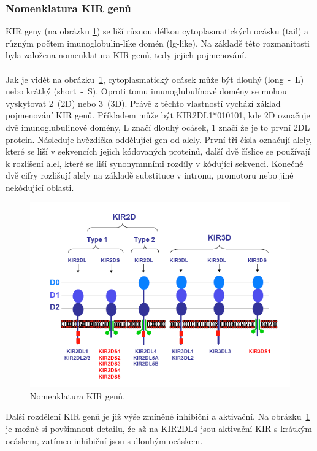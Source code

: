 \documentclass[czech,DP]{thesiskiv}
\numberwithin{equation}{section}
\begin{document}
\subsubsection{Nomenklatura KIR genů}
KIR geny (na obrázku \ref{fig:img_kir_nomenklatura}) se liší různou délkou cytoplasmatických ocásku (tail) a různým počtem imunoglobulin-like domén (lg-like). Na základě této rozmanitosti byla založena nomenklatura KIR genů, tedy jejich pojmenování. 
\\
\\
Jak je vidět na obrázku~\ref{fig:img_kir_nomenklatura}, cytoplasmatický ocásek může být dlouhý (long~-~L) nebo krátký (short~-~S). Oproti tomu imunoglubulínové domény se mohou vyskytovat 2~(2D) nebo 3~(3D). Právě z těchto vlastností vychází základ pojmenování KIR genů. Příkladem může být KIR2DL1*010101, kde 2D označuje dvě imunoglubulinové domény, L značí dlouhý ocásek, 1 značí že je to první 2DL protein. Následuje hvězdička oddělující gen od alely. První tři čísla označují alely, které se liší v sekvencích jejich kódovaných proteinů, další dvě číslice se používají k rozlišení alel, které se liší synonymnními rozdíly v kódující sekvenci. Konečné dvě cifry rozlišují alely na základě substituce v intronu, promotoru nebo jiné nekódující oblasti. \cite{imgt_hla_database}

\begin{figure}[H]		
		\centering
		\includegraphics[width=\textwidth]{./img/KIR_nomenklatura.png}
		\caption{Nomenklatura KIR genů. \cite{KIR_transplantace_jindra}}
		\label{fig:img_kir_nomenklatura}
\end{figure}

\noindent
Další rozdělení KIR genů je již výše zmíněné inhibiční a aktivační. Na obrázku~\ref{fig:img_kir_nomenklatura} je možné si povšimnout detailu, že až na KIR2DL4 jsou aktivační KIR s krátkým ocáskem, zatímco inhibiční jsou s dlouhým ocáskem. 
\end{document}

